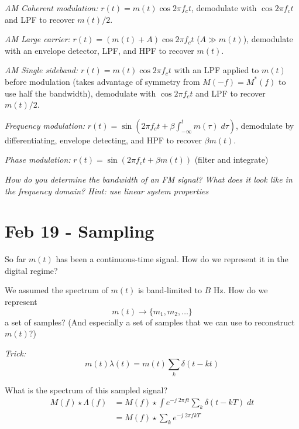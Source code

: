 \documentclass[12pt]{report}
\begin{document}
\emph{AM Coherent modulation:} $r(t) = m(t) \cos 2\pi f_c t$, demodulate with $\cos 2\pi f_c t$ and LPF to recover $m(t)/2$.

\emph{AM Large carrier:} $r(t) = (m(t) + A) \cos 2\pi f_c t$ ($A \gg m(t)$), demodulate with an envelope detector, LPF, and HPF to recover $m(t)$.

\emph{AM Single sideband:} $r(t) = m(t) \cos 2\pi f_c t$ with an LPF applied to $m(t)$ before modulation (takes advantage of symmetry from $M(-f) = M^*(f)$ to use half the bandwidth), demodulate with $\cos 2\pi f_c t$ and LPF to recover $m(t)/2$.

\emph{Frequency modulation:} $r(t) = \sin (2\pi f_c t + \beta \int_{-\infty}^t m(\tau)\; d\tau)$, demodulate by differentiating, envelope detecting, and HPF to recover $\beta m(t)$.

\emph{Phase modulation:} $r(t) = \sin (2\pi f_c t + \beta m(t))$ (filter and integrate)

\emph{How do you determine the bandwidth of an FM signal? What does it look like in the frequency domain? Hint: use linear system properties}

\section{Feb 19 - Sampling}

So far $m(t)$ has been a continuous-time signal. How do we represent it in the digital regime?

We assumed the spectrum of $m(t)$ is band-limited to $B$ Hz. How do we represent 
\[m(t) \to \{m_1, m_2, \dots\}\] 
a set of samples? (And especially a set of samples that we can use to reconstruct $m(t)$?)

\emph{Trick:} 
\[m(t) \lambda(t) = m(t) \sum_k \delta(t - kt)\] 

\begin{center}
\end{center}

What is the spectrum of this sampled signal?
\begin{align*}
    M(f) \star \Lambda(f) &= M(f) \star \int e^{-j\; 2\pi ft} \sum_k \delta(t - kT)\; dt\\ 
    &= M(f) \star \sum_k e^{-j\; 2\pi fkT}\\
\end{align*}
\end{document}
